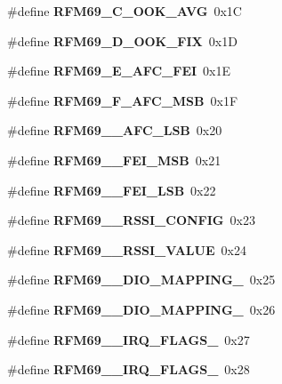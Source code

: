 \begin{DoxyCompactItemize}
\item 
\mbox{\label{_r_f_m69__registri_8h_ac6c0fc701e0d490d49a27ba609a8173e}} 
\#define {\bfseries R\+F\+M69\+\_\+C\+\_\+\+O\+O\+K\+\_\+\+A\+VG}~0x1C
\item 
\mbox{\label{_r_f_m69__registri_8h_afcf56ed9ec553e73a47571564ac9eeff}} 
\#define {\bfseries R\+F\+M69\+\_\+D\+\_\+\+O\+O\+K\+\_\+\+F\+IX}~0x1D
\item 
\mbox{\label{_r_f_m69__registri_8h_ae0ed461b3e70ea2581adbb30f1c35ff1}} 
\#define {\bfseries R\+F\+M69\+\_\+E\+\_\+\+A\+F\+C\+\_\+\+F\+EI}~0x1E
\item 
\mbox{\label{_r_f_m69__registri_8h_ae03069413842faef99a368eb433f3517}} 
\#define {\bfseries R\+F\+M69\+\_\+F\+\_\+\+A\+F\+C\+\_\+\+M\+SB}~0x1F
\item 
\mbox{\label{_r_f_m69__registri_8h_aacc2b75bf3f1ba9cfedf7b51e38797ab}} 
\#define {\bfseries R\+F\+M69\+\_\+\_\+\+A\+F\+C\+\_\+\+L\+SB}~0x20
\item 
\mbox{\label{_r_f_m69__registri_8h_abdf9576dc0507d33ffd7fea823f03c4f}} 
\#define {\bfseries R\+F\+M69\+\_\+\_\+\+F\+E\+I\+\_\+\+M\+SB}~0x21
\item 
\mbox{\label{_r_f_m69__registri_8h_a18c0469c67d8fb36a1f5ce4d966f7c7e}} 
\#define {\bfseries R\+F\+M69\+\_\+\_\+\+F\+E\+I\+\_\+\+L\+SB}~0x22
\item 
\mbox{\label{_r_f_m69__registri_8h_ab9a4e272dd9023293f785d344082b484}} 
\#define {\bfseries R\+F\+M69\+\_\+\_\+\+R\+S\+S\+I\+\_\+\+C\+O\+N\+F\+IG}~0x23
\item 
\mbox{\label{_r_f_m69__registri_8h_a8745dd569ba2d63d0a78f6e5d19a2bbf}} 
\#define {\bfseries R\+F\+M69\+\_\+\_\+\+R\+S\+S\+I\+\_\+\+V\+A\+L\+UE}~0x24
\item 
\mbox{\label{_r_f_m69__registri_8h_a6e96e779dda66d75aba62cad562adf8d}} 
\#define {\bfseries R\+F\+M69\+\_\+\_\+\+D\+I\+O\+\_\+\+M\+A\+P\+P\+I\+N\+G\+\_}~0x25
\item 
\mbox{\label{_r_f_m69__registri_8h_a539f7d02678f5969b88728424870f3df}} 
\#define {\bfseries R\+F\+M69\+\_\+\_\+\+D\+I\+O\+\_\+\+M\+A\+P\+P\+I\+N\+G\+\_}~0x26
\item 
\mbox{\label{_r_f_m69__registri_8h_a0a383c19113ce84622c9dbbb8ab3b226}} 
\#define {\bfseries R\+F\+M69\+\_\+\_\+\+I\+R\+Q\+\_\+\+F\+L\+A\+G\+S\+\_}~0x27
\item 
\mbox{\label{_r_f_m69__registri_8h_ac84ac0cc4c36a18e636bc7d14ffd9ff5}} 
\#define {\bfseries R\+F\+M69\+\_\+\_\+\+I\+R\+Q\+\_\+\+F\+L\+A\+G\+S\+\_}~0x28
\item 

\end{DoxyCompactItemize}
